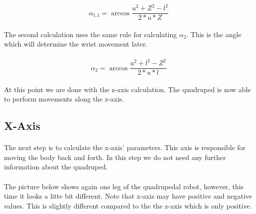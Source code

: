 \documentclass{article}
\begin{document}
    \paragraph{}

    \begin{equation} \label{alpha_1_z}
        \alpha_{1.1} = \arccos \frac{u^2 + Z^2 - l^2}{2 * u * Z} 
    \end{equation}

    \paragraph{}
    The second calculation uses the same rule for calculating $\alpha_2$. This is the angle which will determine the wrist movement later.

    \paragraph{}
    \begin{equation}
        \alpha_2 = \arccos \frac{u^2 + l^2 - Z^2}{2 * u * l} 
    \end{equation}

    \paragraph{}
    At this point we are done with the z-axis calculation. The quadruped is now able to perform movements along the z-axis.



    \subsection{X-Axis}
    \paragraph{} 
    The next step is to calculate the x-axis' parameters. This axis is responsible for moving the body back and forth. In this step we do not need any further information about the quadruped.

    \paragraph{}
    The picture below shows again one leg of the quadrupedal robot, however, this time it looks a litte bit different. Note that x-axis may have positive and negative values. This is slightly different compared to the the z-axis which is only positive. 
\end{document}

